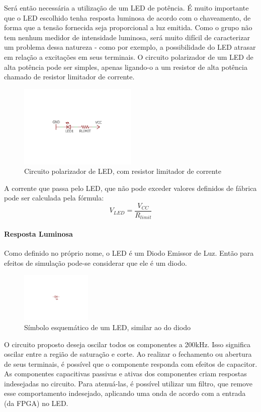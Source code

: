 	Será então necessária a utilização de um LED de potência. É muito importante que o LED escolhido tenha resposta luminosa de acordo com o chaveamento, de forma que a tensão fornecida seja proporcional a luz emitida. Como o grupo não tem nenhum medidor de intensidade luminosa, será muito difícil de caracterizar um problema dessa natureza - como por exemplo, a possibilidade do LED atrasar em relação a excitações em seus terminais. O circuito polarizador de um LED de alta potência pode ser simples, apenas ligando-o a um resistor de alta potência chamado de resistor limitador de corrente.
	
	\begin{figure}[htb]
		\caption{\label{fig_led_circuit}Circuito polarizador de LED, com resistor limitador de corrente}
		\centering
		\includegraphics[width=0.5\textwidth, trim={8cm 8cm 8cm 8.5cm},clip]{circuits/led_circuit.pdf}
	\end{figure}

	A corrente que passa pelo LED, que não pode exceder valores definidos de fábrica pode ser calculada pela fórmula:
	\begin{equation}
	V_{LED} = \frac{V_{CC}}{R_{limit}}
	\end{equation}
	
	\paragraph{Resposta Luminosa}
	
	Como definido no próprio nome, o LED é um Diodo Emissor de Luz. Então para efeitos de simulação pode-se considerar que ele é um diodo.
	\begin{figure}[htb]
		\caption{\label{fig_led_schematic}Símbolo esquemático de um LED, similar ao do diodo}
		\centering
		\includegraphics[width=0.3\textwidth, trim={12cm 9.2cm 12cm 9.5cm},clip]{circuits/led_schematics.pdf}
	\end{figure}
	O circuito proposto deseja oscilar todos os componentes a 200kHz. Isso significa oscilar entre a região de saturação e corte. Ao realizar o fechamento ou abertura de seus terminais, é possível que o componente responda com efeitos de capacitor. As componentes capacitivas passivas e ativas dos componentes criam respostas indesejadas no circuito. Para atenuá-las, é possível utilizar um filtro, que remove esse comportamento indesejado, aplicando uma onda de acordo com a entrada (da FPGA) no LED.
	
